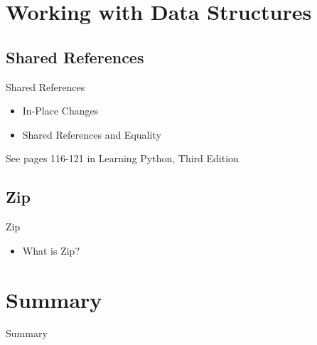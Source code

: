 \documentclass{beamer}
\begin{document}
\section{Working with Data Structures}
\subsection{Shared References}
\begin{frame}[fragile]{Shared References}
\begin{itemize}
\item{In-Place Changes}
\item{Shared References and Equality}
\end{itemize}
\tiny{See pages 116-121 in Learning Python, Third Edition}
\end{frame}

\subsection{Zip}
\begin{frame}[fragile]{Zip}
\begin{itemize}
\item{What is Zip?}
\end{itemize}
\end{frame}

\section{Summary}
\begin{frame}[fragile]{Summary}
\end{frame}
\end{document}
